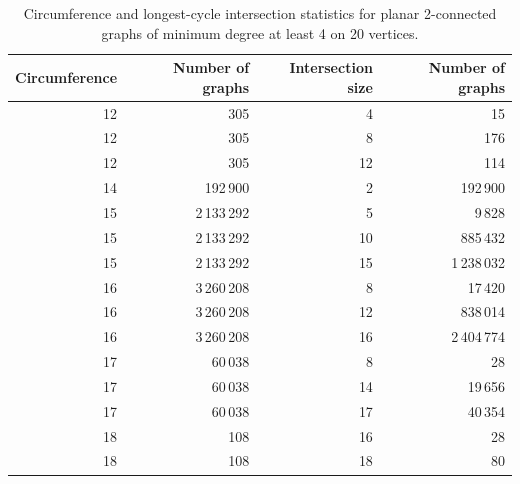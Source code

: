 \begin{table}[ht]
\centering
\caption{Circumference and longest-cycle intersection statistics for planar 2-connected graphs of minimum degree at least 4 on 20 vertices.}
\label{tab:circ-intersection-min4-n20}
\begin{tabular}{rrrr}
\toprule
Circumference & Number of graphs & Intersection size & Number of graphs \\
\midrule
12 & 305 & 4 & 15 \\
12 & 305 & 8 & 176 \\
12 & 305 & 12 & 114 \\
14 & 192\,900 & 2 & 192\,900 \\
15 & 2\,133\,292 & 5 & 9\,828 \\
15 & 2\,133\,292 & 10 & 885\,432 \\
15 & 2\,133\,292 & 15 & 1\,238\,032 \\
16 & 3\,260\,208 & 8 & 17\,420 \\
16 & 3\,260\,208 & 12 & 838\,014 \\
16 & 3\,260\,208 & 16 & 2\,404\,774 \\
17 & 60\,038 & 8 & 28 \\
17 & 60\,038 & 14 & 19\,656 \\
17 & 60\,038 & 17 & 40\,354 \\
18 & 108 & 16 & 28 \\
18 & 108 & 18 & 80 \\
\bottomrule
\end{tabular}
\end{table}